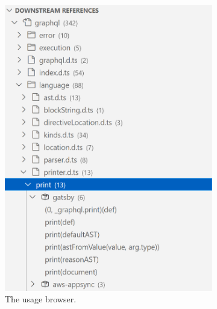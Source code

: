 \begin{figure}
\begin{subfigure}{.32\linewidth}
		\includegraphics[width=\linewidth]{sections/4_implementation/extension/references.png}
		\caption[LoF entry]{The usage browser.}
		\label{fig:implementation/presentation/screenshot/usage_browser}
	\end{subfigure}
	\hfill
	\begin{subfigure}{.32\linewidth}

\end{subfigure}
\end{figure}
